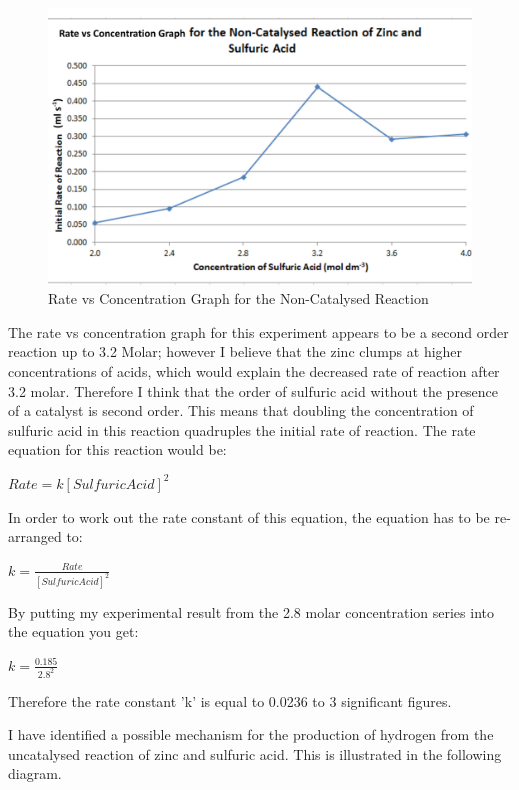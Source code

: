 \begin{figure}[H]
    \includegraphics[width=\textwidth]{./Analysis/Images/1NonCatalyst/ProgressGraph.pdf}
    \caption{Rate vs Concentration Graph for the Non-Catalysed Reaction} \label{fig:ProgressGraphSA}
\end{figure}

The rate vs concentration graph for this experiment appears to be a second order reaction up to 3.2 Molar; however I believe that the zinc clumps at higher concentrations of acids, which would explain the decreased rate of reaction after 3.2 molar. Therefore I think that the order of sulfuric acid without the presence of a catalyst is second order. This means that doubling the concentration of sulfuric acid in this reaction quadruples the initial rate of reaction. The rate equation for this reaction would be:

$Rate = k [Sulfuric Acid]^2$

In order to work out the rate constant of this equation, the equation has to be re-arranged to:

$k = \frac{Rate}{[Sulfuric Acid]^2}$

By putting my experimental result from the 2.8 molar concentration series into the equation you get:

$k = \frac{0.185}{2.8^2}$

Therefore the rate constant 'k' is equal to 0.0236 to 3 significant figures.

I have identified a possible mechanism for the production of hydrogen from the uncatalysed reaction of zinc and sulfuric acid. This is illustrated in the following diagram.

